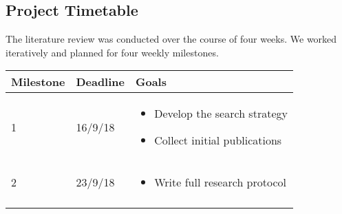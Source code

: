 \documentclass[]{book}
\providecommand{\tightlist}{%
  \setlength{\itemsep}{0pt}\setlength{\parskip}{0pt}}
\begin{document}
\subsection{Project Timetable}\label{project-timetable}

The literature review was conducted over the course of four weeks. We
worked iteratively and planned for four weekly milestones.

\begin{longtable}[]{@{}lll@{}}
\toprule
\begin{minipage}[b]{0.14\columnwidth}\raggedright\strut
Milestone\strut
\end{minipage} & \begin{minipage}[b]{0.13\columnwidth}\raggedright\strut
Deadline\strut
\end{minipage} & \begin{minipage}[b]{0.65\columnwidth}\raggedright\strut
Goals\strut
\end{minipage}\tabularnewline
\midrule
\endhead
\begin{minipage}[t]{0.32\columnwidth}\raggedright\strut
1\strut
\end{minipage} & \begin{minipage}[t]{0.32\columnwidth}\raggedright\strut
16/9/18\strut
\end{minipage} & \begin{minipage}[t]{0.32\columnwidth}\raggedright\strut
\begin{itemize}
\tightlist
\item
  Develop the search strategy
\item
  Collect initial publications
\end{itemize}\strut
\end{minipage}\tabularnewline
\begin{minipage}[t]{0.32\columnwidth}\raggedright\strut
2\strut
\end{minipage} & \begin{minipage}[t]{0.32\columnwidth}\raggedright\strut
23/9/18\strut
\end{minipage} & \begin{minipage}[t]{0.32\columnwidth}\raggedright\strut
\begin{itemize}
\tightlist
\item
  Write full research protocol
\end{itemize}\strut
\end{minipage}\tabularnewline
\begin{minipage}[t]{0.32\columnwidth}\raggedright\strut

\end{minipage}
\end{longtable}
\end{document}
